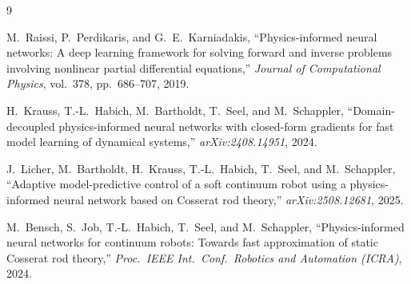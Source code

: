 \documentclass[11pt]{article}
\begin{document}
\begingroup
\renewcommand{\section}[2]{}  %
\begin{thebibliography}{9}

M.~Raissi, P.~Perdikaris, and G.~E.~Karniadakis,
``Physics-informed neural networks: A deep learning framework for solving forward and inverse problems involving nonlinear partial differential equations,''
\emph{Journal of Computational Physics}, vol.~378, pp.~686--707, 2019.

H.~Krauss, T.-L.~Habich, M.~Bartholdt, T.~Seel, and M.~Schappler,
``Domain-decoupled physics-informed neural networks with closed-form gradients for fast model learning of dynamical systems,''
\emph{arXiv:2408.14951}, 2024.

J.~Licher, M.~Bartholdt, H.~Krauss, T.-L.~Habich, T.~Seel, and M.~Schappler,
``Adaptive model-predictive control of a soft continuum robot using a physics-informed neural network based on Cosserat rod theory,''
\emph{arXiv:2508.12681}, 2025.

M.~Bensch, S.~Job, T.-L.~Habich, T.~Seel, and M.~Schappler,
``Physics-informed neural networks for continuum robots: Towards fast approximation of static Cosserat rod theory,''
\emph{Proc.\ IEEE Int.\ Conf.\ Robotics and Automation (ICRA)}, 2024.

\end{thebibliography}
\endgroup
\end{document}
